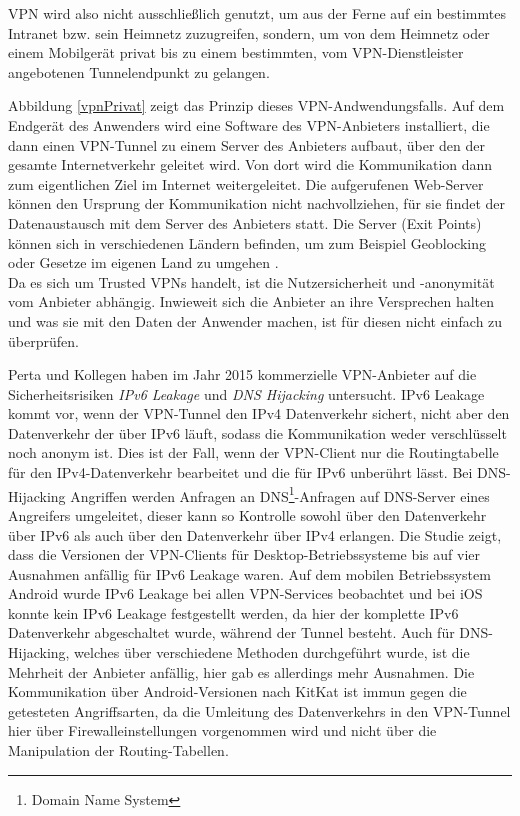 VPN wird also nicht ausschließlich genutzt, um aus der Ferne auf ein bestimmtes Intranet bzw. sein Heimnetz zuzugreifen, sondern, um von dem Heimnetz oder einem Mobilgerät privat bis zu einem bestimmten, vom VPN-Dienstleister angebotenen Tunnel\-endpunkt zu gelangen. 

Abbildung \ref{vpnPrivat} zeigt das Prinzip dieses VPN-Andwendungsfalls. Auf dem Endgerät des Anwenders wird eine Software des VPN-Anbieters installiert, die dann einen VPN-Tunnel zu einem Server des Anbieters aufbaut, über den der gesamte Internetverkehr geleitet wird. Von dort wird die Kommunikation dann zum eigentlichen Ziel im Internet weitergeleitet. Die aufgerufenen Web-Server können den Ursprung der Kommunikation nicht nachvollziehen, für sie findet der Datenaustausch mit dem Server des Anbieters statt. 
Die Server (Exit Points) können sich in verschiedenen Ländern befinden, um zum Beispiel Geoblocking oder Gesetze im eigenen Land zu umgehen \cite{perta2015glance}. \\

Da es sich um Trusted VPNs handelt, ist die Nutzersicherheit und -anonymität vom Anbieter abhängig. Inwieweit sich die Anbieter an ihre Versprechen halten und was sie mit den Daten der Anwender machen, ist für diesen nicht einfach zu überprüfen. 


Perta und Kollegen \cite{perta2015glance} haben im Jahr 2015 kommerzielle VPN-Anbieter auf die Sicherheitsrisiken \emph{IPv6 Leakage} und \emph{DNS Hijacking} untersucht. IPv6 Leakage kommt vor, wenn der VPN-Tunnel den  IPv4 Datenverkehr sichert, nicht aber den Datenverkehr der über IPv6 läuft, sodass die Kommunikation weder verschlüsselt noch anonym ist. Dies ist der Fall, wenn der VPN-Client nur die Routingtabelle für den IPv4-Datenverkehr bearbeitet und die für IPv6 unberührt lässt. 
 Bei DNS-Hijacking Angriffen werden Anfragen an DNS\footnote{Domain Name System}-Anfragen auf DNS-Server eines Angreifers umgeleitet, dieser kann so Kontrolle sowohl über den Datenverkehr über IPv6 als auch über den Datenverkehr über IPv4 erlangen. 
Die Studie zeigt, dass die Versionen der VPN-Clients für Desktop-Betriebssysteme bis auf vier Ausnahmen anfällig für IPv6 Leakage waren. Auf dem mobilen Betriebssystem Android wurde IPv6 Leakage bei allen VPN-Services beobachtet und bei iOS konnte kein IPv6 Leakage festgestellt werden, da hier der komplette IPv6 Datenverkehr abgeschaltet wurde, während der Tunnel besteht. 
Auch für DNS-Hijacking, welches über verschiedene Methoden durchgeführt wurde, ist die Mehrheit der Anbieter anfällig, hier gab es allerdings mehr Ausnahmen. Die Kommunikation über Android-Versionen nach KitKat ist immun gegen die getesteten Angriffsarten, da die Umleitung des Datenverkehrs in den VPN-Tunnel hier über Firewalleinstellungen vorgenommen wird und nicht über die Manipulation der Routing-Tabellen. 

